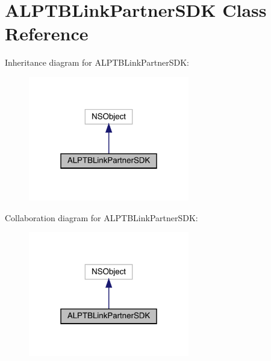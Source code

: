 \hypertarget{interface_a_l_p_t_b_link_partner_s_d_k}{}\section{A\+L\+P\+T\+B\+Link\+Partner\+S\+DK Class Reference}
\label{interface_a_l_p_t_b_link_partner_s_d_k}


Inheritance diagram for A\+L\+P\+T\+B\+Link\+Partner\+S\+DK\+:\nopagebreak
\begin{figure}[H]
\begin{center}
\leavevmode
\includegraphics[width=199pt]{interface_a_l_p_t_b_link_partner_s_d_k__inherit__graph}
\end{center}
\end{figure}


Collaboration diagram for A\+L\+P\+T\+B\+Link\+Partner\+S\+DK\+:\nopagebreak
\begin{figure}[H]
\begin{center}
\leavevmode
\includegraphics[width=199pt]{interface_a_l_p_t_b_link_partner_s_d_k__coll__graph}
\end{center}
\end{figure}
